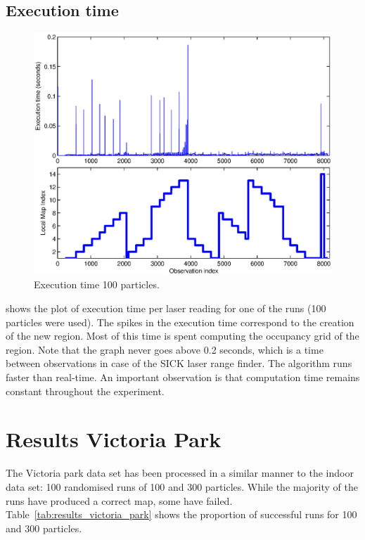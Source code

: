 \subsection{Execution time}


\begin{figure}[htbp]
  \centering
  \includegraphics[width=15cm]{Pics/corners_execution_time}
  
  \caption{Execution time 100 particles.}
  \label{fig:corners_execution_time}
\end{figure}

 shows the plot of execution
time per laser reading for one of the runs (100 particles were used).
The spikes in the execution time correspond to the creation of the new
region. Most of this time is spent computing the occupancy grid of the
region. Note that the graph never goes above 0.2 seconds, which is a
time between observations in case of the SICK laser range finder. The
algorithm runs faster than real-time. An important observation is that
computation time remains constant throughout the experiment.

\section {Results Victoria Park}

The Victoria park data set has been processed in a similar manner to
the indoor data set: 100 randomised runs of 100 and 300
particles. While the majority of the runs have produced a correct map,
some have failed. Table~\ref{tab:results_victoria_park} shows the
proportion of successful runs for 100 and 300 particles.

